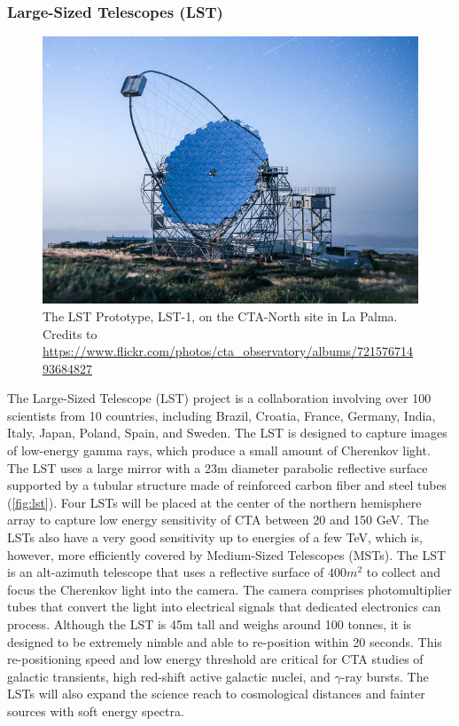 \subsubsection{Large-Sized Telescopes (LST)}
\begin{figure}[t]
\centering
\includegraphics[width=0.9\linewidth]{figures/introduction/lst.jpg}
\caption{The LST Prototype, LST-1, on the CTA-North site in La Palma. Credits to \url{https://www.flickr.com/photos/cta_observatory/albums/72157671493684827}} 
\label{fig:lst}
\end{figure}
The Large-Sized Telescope (LST) project is a collaboration involving over 100 scientists from 10 countries, including Brazil, Croatia, France, Germany, India, Italy, Japan, Poland, Spain, and Sweden. The LST is designed to capture images of low-energy gamma rays, which produce a small amount of Cherenkov light. The LST uses a large mirror with a 23m diameter parabolic reflective surface supported by a tubular structure made of reinforced carbon fiber and steel tubes (\autoref{fig:lst}).  Four LSTs will be placed at the center of the northern hemisphere array to capture low energy sensitivity of CTA between 20 and 150 GeV. The LSTs also have a very good sensitivity up to energies of a few TeV, which is, however, more efficiently covered by Medium-Sized Telescopes (MSTs). The LST is an alt-azimuth telescope that uses a reflective surface of $400 m^2$ to collect and focus the Cherenkov light into the camera. The camera comprises photomultiplier tubes that convert the light into electrical signals that dedicated electronics can process. Although the LST is 45m tall and weighs around 100 tonnes, it is designed to be extremely nimble and able to re-position within 20 seconds. This re-positioning speed and low energy threshold are critical for CTA studies of galactic transients, high red-shift active galactic nuclei, and $\gamma$-ray bursts. The LSTs will also expand the science reach to cosmological distances and fainter sources with soft energy spectra. 
